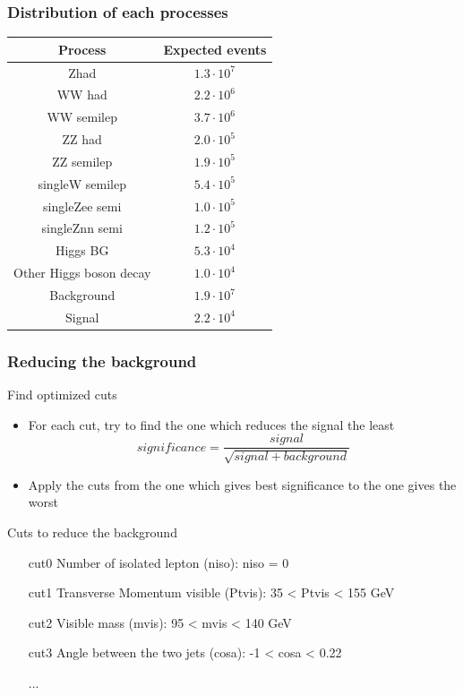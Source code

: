 \documentclass{beamer}
\begin{document}
\begin{frame}
  \frametitle{Distribution of each processes}

  \begin{center}
    \footnotesize{
      \begin{tabular}{c c}
         Process        &  Expected events   \tabularnewline
        \hline
        \hline
        Zhad            & $1.3 \cdot 10^{7}$ \tabularnewline
        WW had          & $2.2 \cdot 10^{6}$ \tabularnewline
        WW semilep      & $3.7 \cdot 10^{6}$ \tabularnewline
        ZZ had          & $2.0 \cdot 10^{5}$ \tabularnewline
        ZZ semilep      & $1.9 \cdot 10^{5}$ \tabularnewline
        singleW semilep & $5.4 \cdot 10^{5}$ \tabularnewline
        singleZee semi  & $1.0 \cdot 10^{5}$ \tabularnewline
        singleZnn semi  & $1.2 \cdot 10^{5}$ \tabularnewline
        Higgs BG        & $5.3 \cdot 10^{4}$ \tabularnewline
        Other Higgs boson decay    & $1.0 \cdot 10^{4}$ \tabularnewline
        \hline
        Background              & $1.9 \cdot 10^{7}$ \tabularnewline
        Signal          & $2.2 \cdot 10^{4}$ \tabularnewline
        \hline
      \end{tabular}
    }   
  \end{center}
\end{frame}

\begin{frame}
    \frametitle{Reducing the background}

    \begin{block}{Find optimized cuts}
        \begin{itemize}
            \item For each cut, try to find the one which reduces the signal the least
                \[significance = \frac{signal}{\sqrt{signal + background}}\]
            \item Apply the cuts from the one which gives best significance to the one gives the worst
        \end{itemize}
    \end{block}

    \begin{exampleblock}{Cuts to reduce the background}
        \begin{enumerate}
            \item [cut0] Number of isolated lepton (niso): niso = 0 %
            \item [cut1] Transverse Momentum visible (Ptvis): 35 < Ptvis < 155 GeV
            \item [cut2] Visible mass (mvis): 95 < mvis < 140 GeV
            \item [cut3] Angle between the two jets (cosa): -1 < cosa < 0.22
            \item [...]
        \end{enumerate}
    \end{exampleblock}

\end{frame}
\end{document}
